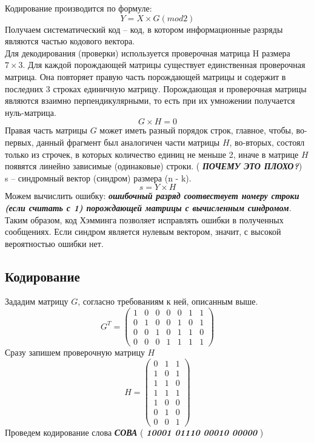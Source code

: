 \documentclass[a5paper, 10pt]{article}
\theoremstyle{definition}
\theoremstyle{plain}
\theoremstyle{remark}
\begin{document}
Кодирование производится по формуле:
\begin{equation}
Y = X \times G  (mod 2)
\end{equation}
Получаем систематический код -- код, в котором информационные разряды являются частью кодового вектора.\\

Для декодирования (проверки) используется проверочная матрица H размера $7 \times 3$. Для каждой порождающей матрицы существует единственная проверочная матрица. Она повторяет правую часть порождающей матрицы и содержит в последних 3 строках единичную матрицу. Порождающая и проверочная матрицы являются взаимно перпендикулярными, то есть при их умножении получается нуль-матрица.
\begin{equation}
G \times H  = 0
\end{equation}
Правая часть матрицы $G$ может иметь разный порядок строк, главное, чтобы, во-первых, данный фрагмент был аналогичен части матрицы $H$, во-вторых, состоял только из строчек, в которых количество единиц не меньше 2, иначе в матрице $H$ появятся линейно зависимые (одинаковые) строки. ( \textbf{\textit{ПОЧЕМУ ЭТО ПЛОХО?}})\\
s -- синдромный вектор (синдром) размера (n - k).
\begin{equation}
s = Y \times H
\end{equation}
Можем вычислить ошибку:  \textbf{\textit{ошибочный разряд соотвествует номеру строки (если считать с 1) порождающей матрицы с вычисленным синдромом}}. Таким образом, код Хэмминга позволяет исправлять ошибки в полученных сообщениях. Если синдром является нулевым вектором, значит, с высокой вероятностью ошибки нет.

\subsection{Кодирование}
Зададим матрицу $G$, согласно требованиям к ней, описанным выше.
\begin{equation}
G^{T} = 
\begin{pmatrix}
1 & 0 & 0 & 0 & 0 & 1 & 1\\
0 & 1 & 0 & 0 & 1 & 0 & 1\\
0 & 0 & 1 & 0 & 1 & 1 & 0\\
0 & 0 & 0 & 1 & 1 & 1 & 1
\end{pmatrix}
\end{equation}
Сразу запишем проверочную матрицу $H$
\begin{equation}
H = 
\begin{pmatrix}
 0 & 1 & 1\\
 1 & 0 & 1\\
 1 & 1 & 0\\
 1 & 1 & 1 \\
1 & 0 & 0\\
0 & 1 & 0 \\
0 & 0 & 1
\end{pmatrix}
\end{equation}
Проведем кодирование слова \textbf{\textit{СОВА}} (  \textbf{\textit{10001 01110 00010 00000}} )
\end{document}

